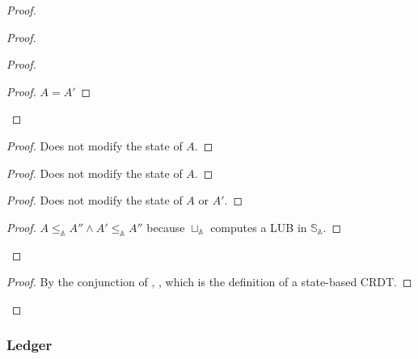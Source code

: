\documentclass[9pt, oneside]{article}   	%
\begin{document}
\begin{proof}
\begin{proof}
\begin{proof}
			\begin{proof}
				$A=A'$
			\end{proof}
		\end{proof}
		
		\begin{proof}
			Does not modify the state of $A$.
		\end{proof}
		
		\begin{proof}
			Does not modify the state of $A$.
		\end{proof}
		
		\begin{proof}
			Does not modify the state of $A$ or $A'$.
		\end{proof}
		
		\begin{proof}
			$A \leq_\mathds{A} A'' \wedge A' \leq_\mathds{A} A''$ because $\sqcup_\mathds{A}$ computes a LUB in $\mathds{S}_\mathds{A}$.
		\end{proof}
	\end{proof}
	
	\qedstep
	\begin{proof}
		By the conjunction of , ,  which is the definition of a state-based CRDT.
	\end{proof}
\end{proof}


\subsubsection{Ledger}
\end{document}
